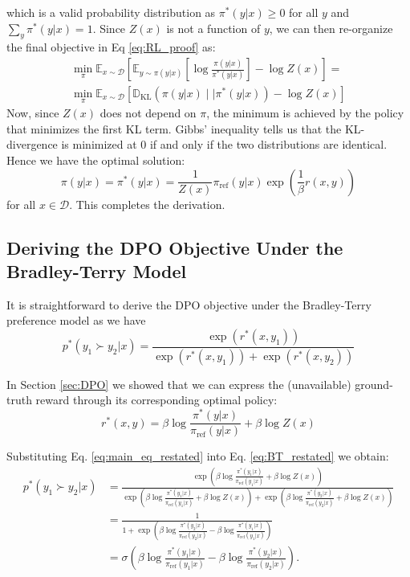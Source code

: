 \documentclass{article}
\begin{document}
which is a valid probability distribution as $\pi^*(y|x)\geq 0$ for all $y$ and $\sum_{y}\pi^*(y|x)=1$. Since $Z(x)$ is not a function of $y$, we can then re-organize the final objective in Eq \ref{eq:RL_proof} as:
\begin{align}
\min_{\pi}  \mathbb{E}_{x\sim \mathcal{D}}\left[\mathbb{E}_{y\sim \pi(y|x)}\left[\log\frac{\pi(y|x)}{\pi^*(y|x)}\right] - \log Z(x)\right]=\\
\min_{\pi}\mathbb{E}_{x\sim\mathcal{D}}\left[\mathbb{D}_{\text{KL}}(\pi(y|x)\mid\mid\pi^*(y|x)) - \log Z(x)\right]
\end{align}
Now, since $Z(x)$ does not depend on $\pi$, the minimum is achieved by the policy that minimizes the first KL term. Gibbs' inequality tells us that the KL-divergence is minimized at 0 if and only if the two distributions are identical. Hence we have the optimal solution:
\begin{equation}
    \pi(y|x)= \pi^*(y|x) = \frac{1}{Z(x)}\pi_\text{ref}(y|x)\exp\left(\frac{1}{\beta}r(x, y)\right)
\end{equation}
for all $x\in\mathcal{D}$. This completes the derivation.

\label{app:derivation1}

\subsection{Deriving the DPO Objective Under the Bradley-Terry Model}
\label{app:derivation2}
It is straightforward to derive the DPO objective under the Bradley-Terry  preference model as we have
\begin{equation}\label{eq:BT_restated}
    p^*(y_1\succ y_2|x)=\frac{\exp\left(r^*(x, y_1)\right)}{\exp\left(r^*(x, y_1)\right) + \exp\left(r^*(x, y_2)\right)}
\end{equation}

In Section \ref{sec:DPO} we showed that we can express the (unavailable) ground-truth reward through its corresponding optimal policy:
\begin{equation}\label{eq:main_eq_restated}
    r^*(x,y) =\beta \log \frac{\pi^*(y|x)}{\pi_\text{ref}(y|x)} + \beta \log Z(x)
\end{equation}

Substituting Eq. \ref{eq:main_eq_restated} into Eq. \ref{eq:BT_restated} we obtain:
\begin{align*}
    p^*(y_1\succ y_2|x)&=\frac{\exp\left(\beta \log \frac{\pi^*(y_1|x)}{\pi_\text{ref}(y_1|x)} + \beta \log Z(x)\right)}{\exp\left(\beta \log \frac{\pi^*(y_1|x)}{\pi_\text{ref}(y_1|x)} + \beta \log Z(x)\right) + \exp\left(\beta \log \frac{\pi^*(y_2|x)}{\pi_\text{ref}(y_2|x)} + \beta \log Z(x)\right)}\\ &=
    \frac{1}{1+\exp\left(\beta \log \frac{\pi^*(y_2|x)}{\pi_\text{ref}(y_2|x)}-\beta \log \frac{\pi^*(y_1|x)}{\pi_\text{ref}(y_1|x)}\right)} \\&= \sigma\left(\beta \log \frac{\pi^*(y_1|x)}{\pi_\text{ref}(y_1|x)} - \beta \log \frac{\pi^*(y_2|x)}{\pi_\text{ref}(y_2|x)}\right).
\end{align*}
\end{document}
